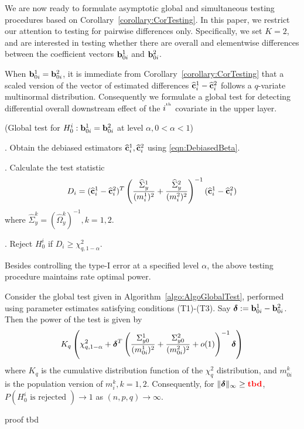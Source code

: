 We are now ready to formulate asymptotic global and simultaneous testing procedures based on Corollary~\ref{corollary:CorTesting}. In this paper, we restrict our attention to testing for pairwise differences only. Specifically, we set $K=2$, and are interested in testing whether there are overall and elementwise differences between the coefficient vectors ${\bf{b}}_{0i}^1$ and ${\bf{b}}_{0i}^2$.

When ${\bf{b}}_{0 i}^1 = {\bf{b}}_{0 i}^2$, it is immediate from Corollary~\ref{corollary:CorTesting} that a scaled version of the vector of estimated differences $\widehat {{\bf{c}}}_i^1 - \widehat {{\bf{c}}}_i^2$ follows a $q$-variate multinormal distribution. Consequently we formulate a global test for detecting differential overall downstream effect of the $i^{\operatorname*{^{\text{th}}}}$ covariate in the upper layer.

\begin{Algorithm}\label{algo:AlgoGlobalTest}
(Global test for $H_0^i: {\bf{b}}_{0 i}^1 = {\bf{b}}_{0 i}^2$ at level $\alpha, 0< \alpha< 1$)

. Obtain the debiased estimators $\widehat {{\bf{c}}}_i^1, \widehat {{\bf{c}}}_i^2$ using \eqref{eqn:DebiasedBeta}.

. Calculate the test statistic
%
$$
D_i = (\widehat {{\bf{c}}}_i^1 - \widehat {{\bf{c}}}_i^2)^T
\left( \frac{ \widehat \Sigma_y^1}{(m_i^1)^2} +
\frac{\widehat \Sigma_y^2}{(m_i^2)^2} \right)^{-1} (\widehat {{\bf{c}}}_i^1 - \widehat {{\bf{c}}}_i^2)
$$
%
where $\widehat \Sigma_y^k = (\widehat \Omega_y^k)^{-1}, k = 1,2$.

. Reject $H_0^i$ if $D_i \geq \chi^2_{q, 1-\alpha}$.
\end{Algorithm}

Besides controlling the type-I error at a specified level $\alpha$, the above testing procedure maintains rate optimal power.

\begin{Theorem}
Consider the global test given in Algorithm~\ref{algo:AlgoGlobalTest}, performed using parameter estimates satisfying conditions (T1)-(T3). Say ${\boldsymbol{\delta}} := {\bf{b}}_{0 i}^1 - {\bf{b}}_{0 i}^2$. Then the power of the test is given by
%
$$
K_q \left( \chi^2_{q,1-\alpha} + {\boldsymbol{\delta}}^T 
\left( \frac{ \Sigma_{y 0}^1}{(m_{0 i}^1)^2} + \frac{\Sigma_{y 0}^2}{(m_{0 i}^2)^2}
+ o(1) \right)^{-1} {\boldsymbol{\delta}} \right)
$$
%
where $K_q$ is the cumulative distribution function of the $\chi^2_q$ distribution, and $m_{0 i}^k$ is the population version of $m_i^k, k=  1,2$. Consequently, for $\| {\boldsymbol{\delta}} \|_\infty \geq {\color{red} \bf tbd}$, $P( H_0^i \text{ is rejected }) \rightarrow 1$ as $(n,p,q) \rightarrow \infty$.
\end{Theorem}
{\colrbf proof tbd}
%

